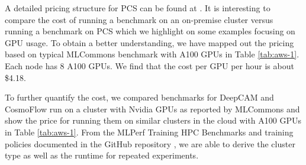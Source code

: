 \documentclass[sigconf]{acmart}
\begin{document}
A detailed pricing structure for PCS can be found at \citep{www-aws-pricing}. It is interesting to compare the cost of running a benchmark on an on-premise cluster versus running a benchmark on PCS which we highlight on some examples focusing on GPU usage. To obtain a better understanding, we have mapped out the pricing based on typical MLCommons benchmark with A100 GPUs in Table \ref{tab:aws-1}. Each node has 8 A100 GPUs. We find that the cost per GPU per hour is about \$4.18.


To further quantify the cost, we compared benchmarks for DeepCAM and CosmoFlow run on a cluster with Nvidia GPUs \citep{mlperf-nvidia-benchmark} as reported by MLCommons and show the price for running them on similar clusters in the cloud with A100 GPUs in Table \ref{tab:aws-1}. From the MLPerf Training HPC Benchmarks \citep{mlcommonsBenchmarkMLPerf} and training policies documented in the GitHub repository \citep{mlperftrainingpolicies}, we are able to derive the cluster type as well as the runtime for repeated experiments. 
\end{document}
